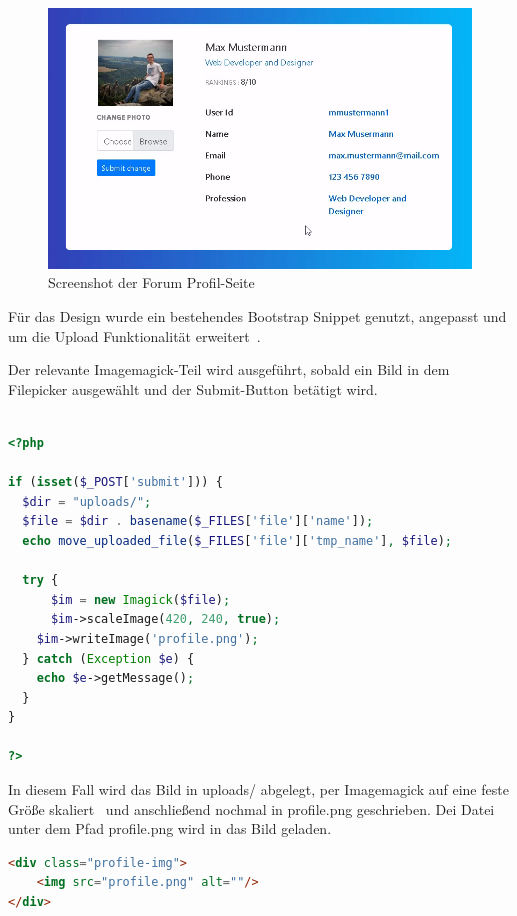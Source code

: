 \begin{figure}[H]
    \includegraphics[width=1\textwidth]{img/ForumAufbau.png}
    \caption{Screenshot der Forum Profil-Seite}\label{fig:forumprofil}
\end{figure}
Für das Design wurde ein bestehendes Bootstrap Snippet genutzt, angepasst und um die Upload Funktionalität erweitert~\cite{BootSnapTemplate}.

Der relevante Imagemagick-Teil wird ausgeführt, sobald ein Bild in dem Filepicker ausgewählt und der Submit-Button betätigt wird.

\begin{lstlisting}[language=PHP, caption=Imagick skalieren und speichern,label={lst:imagickscalesave}]

<?php

if (isset($_POST['submit'])) {
  $dir = "uploads/";
  $file = $dir . basename($_FILES['file']['name']);
  echo move_uploaded_file($_FILES['file']['tmp_name'], $file);

  try {
	  $im = new Imagick($file);
	  $im->scaleImage(420, 240, true);
    $im->writeImage('profile.png');
  } catch (Exception $e) {
    echo $e->getMessage();
  }
}

?>
\end{lstlisting}
\vspace{5mm}

In diesem Fall wird das Bild in uploads/ abgelegt, per Imagemagick auf eine feste Größe skaliert~\cite{PHPImagickScaleImage} und anschließend nochmal in profile.png geschrieben.
Dei Datei unter dem Pfad profile.png wird in das Bild geladen.

\begin{lstlisting}[language=HTML, caption=Profile Image,label={lst:htmlimg}]
<div class="profile-img">
	<img src="profile.png" alt=""/>
</div>
\end{lstlisting}
\vspace{5mm}

